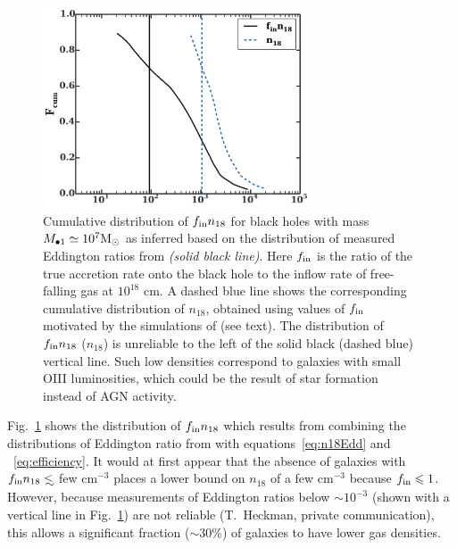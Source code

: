 \documentclass[usenatbib,fleqn]{mnras}
\newcommand\lsim{\mathrel{\rlap{\lower4pt\hbox{\hskip1pt$\sim$}}
    \raise1pt\hbox{$<$}}}
\newcommand{\Mbh}[1][]{M_{\bullet1}}
\newcommand{\Msun}{{\rm M_\odot}}
\begin{document}
\begin{figure}
\includegraphics[width=8cm]{fcum_n18.pdf}
\caption{\label{fig:n18Cum} Cumulative distribution of $f_{\rm in}
  n_{18}$ for black holes with mass $\Mbh\simeq 10^{7} \Msun$ as
  inferred based on the distribution of measured Eddington ratios from
  \citet{Kauffmann&Heckman2009} {\it (solid black line)}. Here $f_{\rm
    in}$ is the ratio of the true accretion rate onto the black hole
  to the inflow rate of free-falling gas at $10^{18}$ cm.  A dashed
  blue line shows the corresponding cumulative distribution of
  $n_{18}$, obtained using values of $f_{\rm in}$ motivated by the
  simulations of \citet{Li+2013} (see text). The distribution of
  $f_{\rm in} n_{18}$ ($n_{18}$) is unreliable to the left of the
  solid black (dashed blue) vertical line.  Such low densities
  correspond to galaxies with small OIII luminosities, which could be
  the result of star formation instead of AGN activity.}
\end{figure}


Fig.~\ref{fig:n18Cum} shows the distribution of $f_{\rm in} n_{18}$
which results from combining the distributions of Eddington ratio from
\citet{Kauffmann&Heckman2009} with equations~\eqref{eq:n18Edd} and
~\eqref{eq:efficiency}.  It would at first appear that the absence of
galaxies with $f_{\rm in }n_{18} \lsim$ few cm$^{-3}$ places a lower
bound on $n_{18}$ of a few cm$^{-3}$ because $f_{\rm in} \le 1$.
However, because measurements of Eddington ratios below $\sim 10^{-3}$
(shown with a vertical line in Fig.~\ref{fig:n18Cum}) are not reliable
(T.~Heckman, private communication), this allows a significant fraction
($\sim 30\%$) of galaxies to have lower gas densities.
\end{document}
